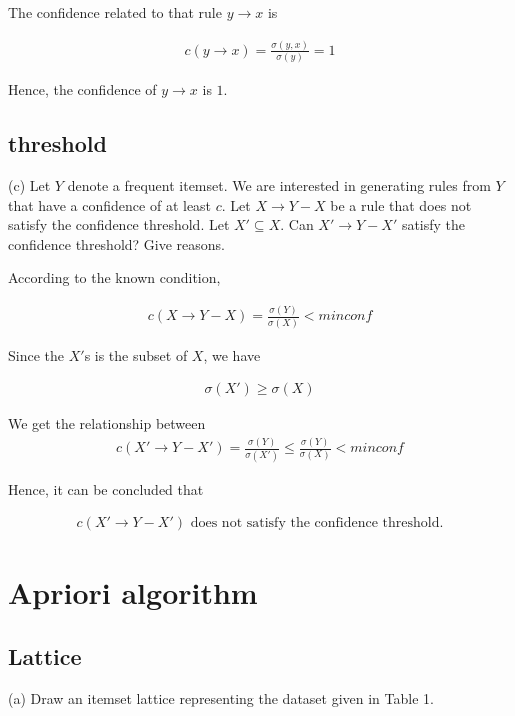 \documentclass[11pt,a4paper]{article}
\begin{document}
The confidence related to that rule $y \rightarrow x$ is

\begin{align}
    c(y \rightarrow x) = \frac{\sigma(y,x)}{\sigma(y)} = 1
\end{align}

Hence, the confidence of $y \rightarrow x$ is $1$.

\subsection{threshold} 
(c) Let $Y$ denote a frequent itemset. We are interested in generating rules
from $Y$ that have a confidence of at least $c$. Let $X \rightarrow Y - X$ be a rule
that does not satisfy the confidence threshold. Let $X′ \subseteq X$. Can 
$X′ \rightarrow Y - X′$ satisfy the confidence threshold? Give reasons.

According to the known condition, 

\begin{align}
    c(X \rightarrow Y - X) = \frac{\sigma(Y)}{\sigma(X)} < minconf
\end{align}

Since the $X'$s is the subset of $X$, we have

\begin{align}
    \sigma(X') \geq \sigma(X)
\end{align}

We get the relationship between 
\begin{align}
    c(X′ \rightarrow Y - X′) = \frac{\sigma(Y)}{\sigma(X')} \leq
    \frac{\sigma(Y)}{\sigma(X)} < minconf
\end{align}

Hence, it can be concluded that 

\begin{align}
    c(X′ \rightarrow Y - X′) \text{ does not satisfy the confidence threshold.}
\end{align}

\newpage
\section{Apriori algorithm}
\subsection{Lattice}
(a) Draw an itemset lattice representing the dataset given in Table 1.
\end{document}

